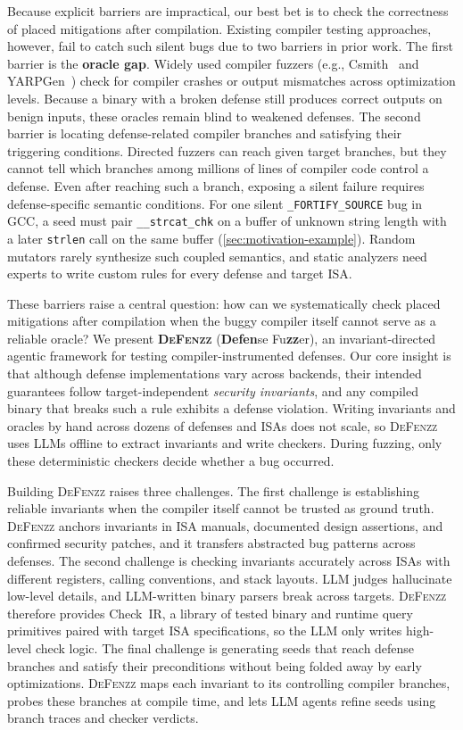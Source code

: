 \documentclass[conference,compsoc]{IEEEtran}
\begin{document}
Because explicit barriers are impractical, our best bet is to check the correctness of placed mitigations after compilation. Existing compiler testing approaches, however, fail to catch such silent bugs due to two barriers in prior work. The first barrier is the \textbf{oracle gap}. Widely used compiler fuzzers (e.g., Csmith~\cite{yang2011csmith} and YARPGen~\cite{livinskii2020yarpgen}) check for compiler crashes or output mismatches across optimization levels. Because a binary with a broken defense still produces correct outputs on benign inputs, these oracles remain blind to weakened defenses. The second barrier is locating defense-related compiler branches and satisfying their triggering conditions. Directed fuzzers can reach given target branches, but they cannot tell which branches among millions of lines of compiler code control a defense. Even after reaching such a branch, exposing a silent failure requires defense-specific semantic conditions. For one silent \texttt{\_FORTIFY\_SOURCE} bug in GCC, a seed must pair \texttt{\_\_strcat\_chk} on a buffer of unknown string length with a later \texttt{strlen} call on the same buffer (\autoref{sec:motivation-example}). Random mutators rarely synthesize such coupled semantics, and static analyzers need experts to write custom rules for every defense and target ISA.

These barriers raise a central question: how can we systematically check placed mitigations after compilation when the buggy compiler itself cannot serve as a reliable oracle? We present \textbf{\textsc{DeFenzz}} (\textbf{Defen}se Fu\textbf{zz}er), an invariant-directed agentic framework for testing compiler-instrumented defenses. Our core insight is that although defense implementations vary across backends, their intended guarantees follow target-independent \emph{security invariants}, and any compiled binary that breaks such a rule exhibits a defense violation. Writing invariants and oracles by hand across dozens of defenses and ISAs does not scale, so \textsc{DeFenzz} uses LLMs offline to extract invariants and write checkers. During fuzzing, only these deterministic checkers decide whether a bug occurred.

Building \textsc{DeFenzz} raises three challenges. The first challenge is establishing reliable invariants when the compiler itself cannot be trusted as ground truth. \textsc{DeFenzz} anchors invariants in ISA manuals, documented design assertions, and confirmed security patches, and it transfers abstracted bug patterns across defenses. The second challenge is checking invariants accurately across ISAs with different registers, calling conventions, and stack layouts. LLM judges hallucinate low-level details, and LLM-written binary parsers break across targets. \textsc{DeFenzz} therefore provides Check~IR, a library of tested binary and runtime query primitives paired with target ISA specifications, so the LLM only writes high-level check logic. The final challenge is generating seeds that reach defense branches and satisfy their preconditions without being folded away by early optimizations. \textsc{DeFenzz} maps each invariant to its controlling compiler branches, probes these branches at compile time, and lets LLM agents refine seeds using branch traces and checker verdicts.
\end{document}
